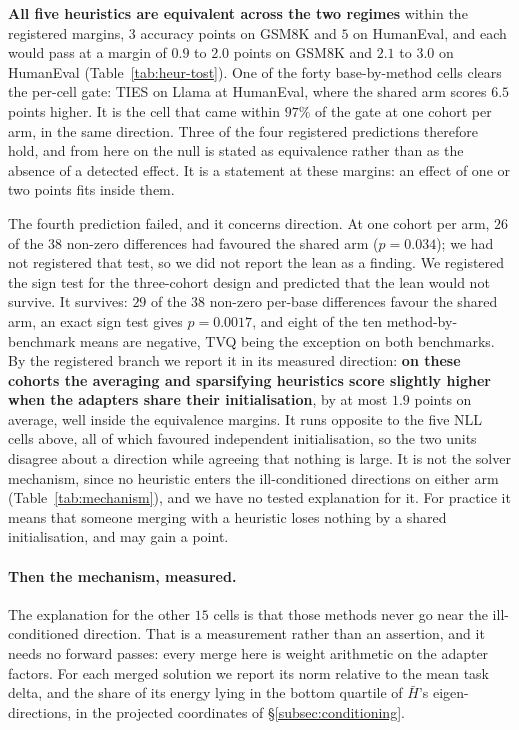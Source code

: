 \textbf{All five heuristics are equivalent across the two regimes} within the
registered margins, $3$ accuracy points on GSM8K and $5$ on HumanEval, and each
would pass at a margin of $0.9$ to $2.0$ points on GSM8K and $2.1$ to $3.0$ on
HumanEval (Table~\ref{tab:heur-tost}). One of the forty base-by-method cells
clears the per-cell gate: TIES on Llama at HumanEval, where the shared arm
scores $6.5$ points higher. It is the cell that came within $97\%$ of the gate
at one cohort per arm, in the same direction. Three of the four registered
predictions therefore hold, and from here on the null is stated as equivalence
rather than as the absence of a detected effect. It is a statement at these
margins: an effect of one or two points fits inside them.

The fourth prediction failed, and it concerns direction. At one cohort per arm,
$26$ of the $38$ non-zero differences had favoured the shared arm
($p = 0.034$); we had not registered that test, so we did not report the lean
as a finding. We registered the sign test for the three-cohort design and
predicted that the lean would not survive. It survives: $29$ of the $38$
non-zero per-base differences favour the shared arm, an exact sign test gives
$p = 0.0017$, and eight of the ten method-by-benchmark means are negative, TVQ
being the exception on both benchmarks. By the registered branch we report it
in its measured direction: \textbf{on these cohorts the averaging and
sparsifying heuristics score slightly higher when the adapters share their
initialisation}, by at most $1.9$ points on average, well inside the
equivalence margins. It runs opposite to the five NLL cells above, all of which
favoured independent initialisation, so the two units disagree about a
direction while agreeing that nothing is large. It is not the solver mechanism,
since no heuristic enters the ill-conditioned directions on either arm
(Table~\ref{tab:mechanism}), and we have no tested explanation for it. For
practice it means that someone merging with a heuristic loses nothing by a
shared initialisation, and may gain a point.

\paragraph{Then the mechanism, measured.} The explanation for the other
$15$ cells is that those methods never go near the ill-conditioned
direction. That is a measurement rather than an assertion, and it needs no
forward passes: every merge here is weight
arithmetic on the adapter factors. For each merged solution we report its
norm relative to the mean task delta, and the share of its energy lying in
the bottom quartile of $\bar H$'s eigen-directions, in the projected
coordinates of \S\ref{subsec:conditioning}.

